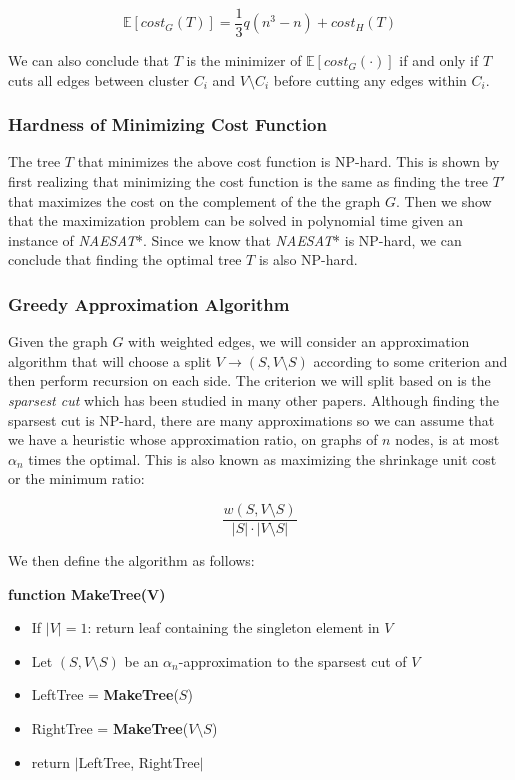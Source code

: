 \documentclass{article}
\begin{document}
$$\mathbb{E}[cost_G(T)] = \frac{1}{3} q (n^3 - n) + cost_H(T)$$

We can also conclude that $T$ is the minimizer of $\mathbb{E}[cost_G(\cdot)]$ if and only if $T$ cuts all edges between cluster $C_i$ and $V \setminus C_i$ before cutting any edges within $C_i$.

\subsubsection{Hardness of Minimizing Cost Function}
The tree $T$ that minimizes the above cost function is NP-hard. This is shown by first realizing that minimizing the cost function is the same as finding the tree $T'$ that maximizes the cost on the complement of the the graph $G$. Then we show that the maximization problem can be solved in polynomial time given an instance of \textit{NAESAT}*. Since we know that \textit{NAESAT}* is NP-hard, we can conclude that finding the optimal tree $T$ is also NP-hard. 


\subsubsection{Greedy Approximation Algorithm}
Given the graph $G$ with weighted edges, we will consider an approximation algorithm that will choose a split $V \rightarrow (S, V \setminus S)$ according to some criterion and then perform recursion on each side. The criterion we will split based on is the \textit{sparsest cut} which has been studied in many other papers. Although finding the sparsest cut is NP-hard, there are many approximations so we can assume that we have a heuristic whose approximation ratio, on graphs of $n$ nodes, is at most $\alpha_n$ times the optimal. This is also known as maximizing the shrinkage unit cost or the minimum ratio:

$$ \frac{w(S, V \setminus S)}{|S| \cdot |V \setminus S|}$$

We then define the algorithm as follows:

\bigskip
\textbf{function MakeTree(V)}

\begin{itemize}
  \item If $|V| = 1$: return leaf containing the singleton element in $V$
  \item Let $(S, V \setminus S)$ be an $\alpha_n$-approximation to the sparsest cut of $V$
  \item LeftTree = \textbf{MakeTree}($S$)
  \item RightTree = \textbf{MakeTree}($V \setminus S$)
  \item return $|$LeftTree, RightTree$|$
\end{itemize}
\end{document}
